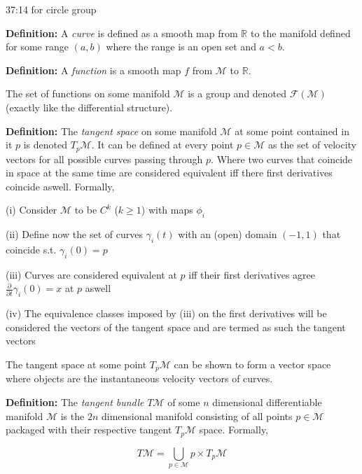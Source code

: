 \documentclass{article}\usepackage[]{graphicx}\usepackage[]{color}
\begin{document}
37:14 for circle group


\textbf{Definition:} A \textit{curve} is defined as a smooth map from $\mathbb{R}$ to the manifold defined for some range $(a,b)$ where the range is an open set and $a<b$.




\textbf{Definition:} A \textit{function} is a smooth map $f$ from $\mathcal{M}$ to $\mathbb{R}$.

 

The set of functions on some manifold $\mathcal{M}$ is a group and denoted $\mathcal{F(M)}$ (exactly like the differential structure).

\textbf{Definition:} The \textit{tangent space} on some manifold $\mathcal{M}$ at some point contained in it $p$ is denoted $T_p\mathcal{M}$. It can be defined at every point $p \in \mathcal{M}$ as the set of velocity vectors for all possible curves passing through $p$. Where two curves that coincide in space at the same time are considered equivalent iff there first derivatives coincide aswell. Formally,

(i) Consider $\mathcal{M}$ to be $C^k$ ($k\geq 1$) with maps $\phi_i$

(ii) Define now the set of curves $\gamma_i(t)$ with an (open) domain $(-1,1)$ that coincide s.t. $\gamma_i(0)=p$

(iii) Curves are considered equivalent at $p$ iff their first derivatives agree $\frac{\partial }{\partial t} \gamma_i(0)=x$ at $p$ aswell

(iv) The equivalence classes imposed by (iii) on the first derivatives will be considered the vectors of the tangent space and are termed as such the tangent vectors

The tangent space at some point $T_p\mathcal{M}$ can be shown to form a vector space where objects are the instantaneous velocity vectors of curves.

\vspace{-2.5cm}

 


\textbf{Definition:} The \textit{tangent bundle} $T\mathcal{M}$ of some $n$ dimensional differentiable manifold $\mathcal{M}$ is the $2n$ dimensional manifold consisting of all points $p\in\mathcal{M}$ packaged with their respective tangent $T_p\mathcal{M}$ space. Formally,

$$
T\mathcal{M}=\bigcup_{p\in\mathcal{M}}p\times T_p\mathcal{M}
$$
\end{document}

